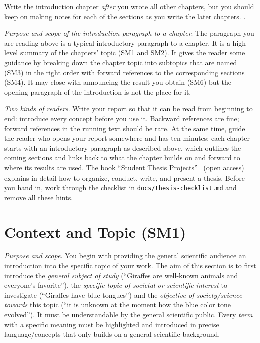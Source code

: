 Write the introduction chapter \emph{after} you wrote all other chapters, but you should keep on making notes for each of the sections as you write the later chapters.
.

\emph{Purpose and scope of the introduction paragraph to a chapter}.
The paragraph you are reading above is a typical introductory paragraph to a chapter.
It is a high-level summary of the chapters' topic (SM1 and SM2).
It gives the reader some guidance by breaking down the chapter topic into subtopics that are named (SM3) in the right order with forward references to the corresponding sections (SM4).
It may close with announcing the result you obtain (SM6) but the opening paragraph of the introduction is not the place for it.

\emph{Two kinds of readers}.
Write your report so that it can be read from beginning to end: introduce every concept before you use it.
Backward references are fine; forward references in the running text should be rare.
At the same time, guide the reader who opens your report somewhere and has ten minutes:
each chapter starts with an introductory paragraph as described above, which outlines the coming sections and links back to what the chapter builds on and forward to where its results are used.
The book \enquote{Student Thesis Projects}~\cite{Lichter2026} (open access) explains in detail how to organize, conduct, write, and present a thesis.
Before you hand in, work through the checklist in \href{https://github.com/latextemplates/scientific-thesis-template/blob/main/docs/thesis-checklist.md}{\texttt{docs/thesis-checklist.md}} and remove all these hints.

\section{Context and Topic (SM1)}\label{sec:introduction:topic}

\emph{Purpose and scope}.
You begin with providing the general scientific audience an introduction into the specific topic of your work.
The aim of this section is to first introduce the \emph{general subject of study} (``Giraffes are well-known animals and everyone's favorite''), the \emph{specific topic of societal or scientific interest} to investigate (``Giraffes have blue tongues'') and the \emph{objective of society/science towards} this topic (``it is unknown at the moment how the blue color tone evolved'').
It must be understandable by the general scientific public.
Every \emph{term} with a specific meaning must be highlighted and introduced in precise language/concepts that only builds on a general scientific background.

